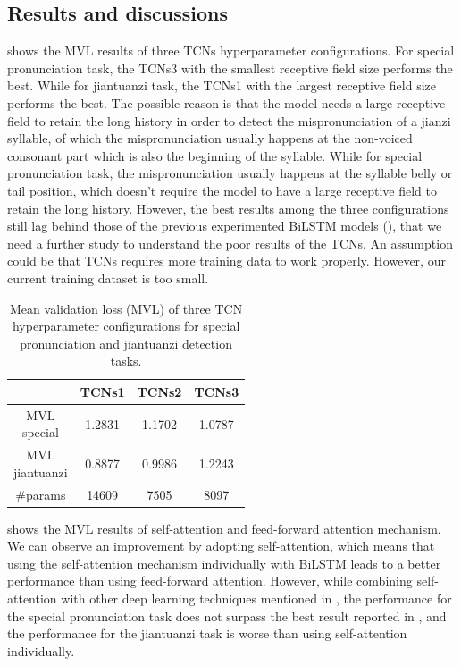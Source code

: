 \subsection{Results and discussions}

 shows the MVL results of three TCNs hyperparameter configurations. For special pronunciation task, the TCNs3 with the smallest receptive field size performs the best. While for \gls{jiantuanzi} task, the TCNs1 with the largest receptive field size performs the best. The possible reason is that the model needs a large receptive field to retain the long history in order to detect the mispronunciation of a \gls{jianzi} syllable, of which the mispronunciation usually happens at the non-voiced consonant part which is also the beginning of the syllable. While for special pronunciation task, the mispronunciation usually happens at the syllable belly or tail position, which doesn't require the model to have a large receptive field to retain the long history. However, the best results among the three configurations still lag behind those of the previous experimented BiLSTM models (), that we need a further study to understand the poor results of the TCNs. An assumption could be that TCNs requires more training data to work properly. However, our current training dataset is too small.

\begin{table}[ht!]
\centering
\caption{Mean validation loss (MVL) of three TCN hyperparameter configurations for special pronunciation and jiantuanzi detection tasks.}
\label{tab:ch6:results_tcns_val}
\begin{tabular}{cccc}
\toprule
& TCNs1 & TCNs2 & TCNs3 \\
\midrule
\makecell{MVL\\special} & 1.2831 & 1.1702 & 1.0787 \\
\makecell{MVL\\jiantuanzi} & 0.8877 & 0.9986 & 1.2243 \\
\#params & 14609 & 7505 & 8097 \\
\bottomrule
\end{tabular}
\end{table}

 shows the MVL results of self-attention and feed-forward attention mechanism. We can observe an improvement by adopting self-attention, which means that using the self-attention mechanism individually with BiLSTM leads to a better performance than using feed-forward attention. However, while combining self-attention with other deep learning techniques mentioned in , the performance for the special pronunciation task does not surpass the best result reported in , and the performance for the \gls{jiantuanzi} task is worse than using self-attention individually.

